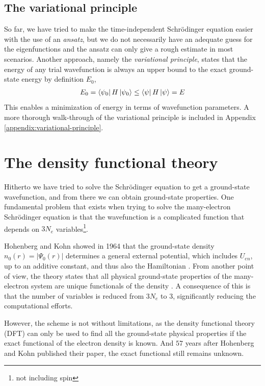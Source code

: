 \subsection{The variational principle}
So far, we have tried to make the time-independent Schrödinger equation easier with the use of an \textit{ansatz}, but we do not necessarily have an adequate guess for the eigenfunctions and the ansatz can only give a rough estimate in most scenarios. Another approach, namely the \textit{variational principle}, states that the energy of any trial wavefunction is always an upper bound to the exact ground-state energy by definition $E_0$,
\begin{align}
  E_0 = \bra{\psi_0 } H \ket{\psi_0} \leq \bra{\psi}H\ket{\psi} = E
  \label{eq:variational}
\end{align} This enables a minimization of energy in terms of wavefunction parameters. A more thorough walk-through of the variational principle is included in Appendix \ref{appendix:variational-principle}.

\section{The density functional theory}

Hitherto we have tried to solve the Schrödinger equation to get a ground-state wavefunction, and from there we can obtain ground-state properties. One fundamental problem that exists when trying to solve the many-electron Schrödinger equation is that the wavefunction is a complicated function that depends on $3N_e$ variables\footnote{not including spin}.

Hohenberg and Kohn \cite{Hohenberg1964} showed in 1964 that the ground-state density $n_0(r) = \lvert \Psi_0 (r)\rvert$ determines a general external potential, which includes $U_{en}$, up to an additive constant, and thus also the Hamiltonian \cite{Toulouse2019}. From another point of view, the theory states that all physical ground-state properties of the many-electron system are unique functionals of the density \cite{Persson2020}. A consequence of this is that the number of variables is reduced from $3N_e$ to $3$, significantly reducing the computational efforts.

However, the scheme is not without limitations, as the density functional theory (DFT) can only be used to find all the ground-state physical properties if the exact functional of the electron density is known. And $57$ years after Hohenberg and Kohn published their paper, the exact functional still remains unknown.

